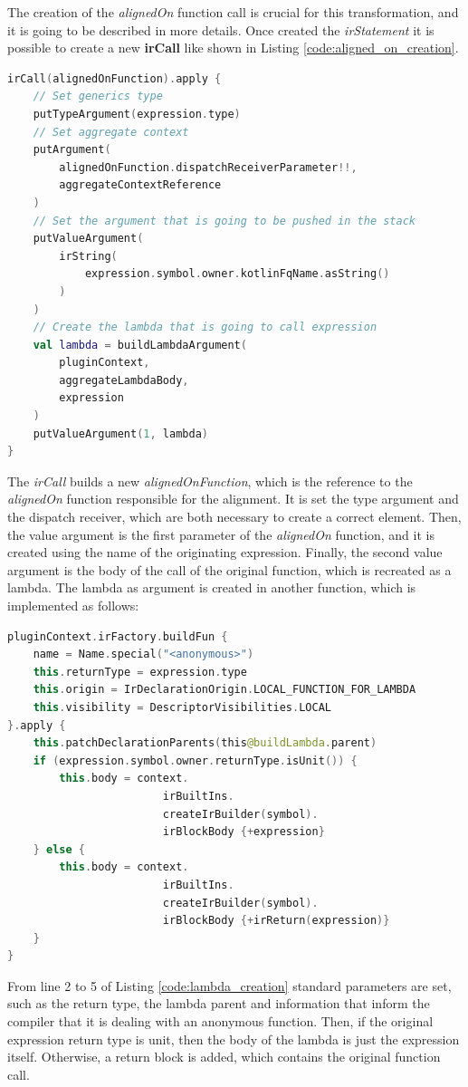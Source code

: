 The creation of the \textit{alignedOn} function call is crucial for this transformation, and it is going to be described in more details.\newline 
Once created the \textit{irStatement} it is possible to create a new \textbf{irCall} like shown in Listing \ref{code:aligned_on_creation}.
\begin{lstlisting}[caption={Generation of the \textit{alignedOn} function call in Listing \ref{code:alignedOn_compiler_plugin}}, captionpos=b, language=Kotlin, label={code:aligned_on_creation}]
irCall(alignedOnFunction).apply {
    // Set generics type
    putTypeArgument(expression.type)
    // Set aggregate context
    putArgument(
        alignedOnFunction.dispatchReceiverParameter!!,
        aggregateContextReference
    )
    // Set the argument that is going to be pushed in the stack
    putValueArgument(
        irString(
            expression.symbol.owner.kotlinFqName.asString()
        )
    )
    // Create the lambda that is going to call expression
    val lambda = buildLambdaArgument(
        pluginContext,
        aggregateLambdaBody,
        expression
    )
    putValueArgument(1, lambda)
}
\end{lstlisting}
The \textit{irCall} builds a new \textit{alignedOnFunction}, which is the reference to the \textit{alignedOn} function responsible for the alignment. It is set the type argument and the dispatch receiver, which are both necessary to create a correct element. Then, the value argument is the first parameter of the \textit{alignedOn} function, and it is created using the name of the originating expression. Finally, the second value argument is the body of the call of the original function, which is recreated as a lambda.\newline
The lambda as argument is created in another function, which is implemented as follows:
\begin{lstlisting}[caption={Generation of the lambda body of the \textit{alignedOn} function call in Listing \ref{code:alignedOn_compiler_plugin}}, captionpos=b, language=Kotlin, label={code:lambda_creation}]
pluginContext.irFactory.buildFun {
    name = Name.special("<anonymous>")
    this.returnType = expression.type
    this.origin = IrDeclarationOrigin.LOCAL_FUNCTION_FOR_LAMBDA
    this.visibility = DescriptorVisibilities.LOCAL
}.apply {
    this.patchDeclarationParents(this@buildLambda.parent)
    if (expression.symbol.owner.returnType.isUnit()) {
        this.body = context.
                        irBuiltIns.
                        createIrBuilder(symbol).
                        irBlockBody {+expression}
    } else {
        this.body = context.
                        irBuiltIns.
                        createIrBuilder(symbol).
                        irBlockBody {+irReturn(expression)}
    }
}
\end{lstlisting}
From line 2 to 5 of Listing \ref{code:lambda_creation} standard parameters are set, such as the return type, the lambda parent and information that inform the compiler that it is dealing with an anonymous function. Then, if the original expression return type is unit, then the body of the lambda is just the expression itself. Otherwise, a return block is added, which contains the original function call.

